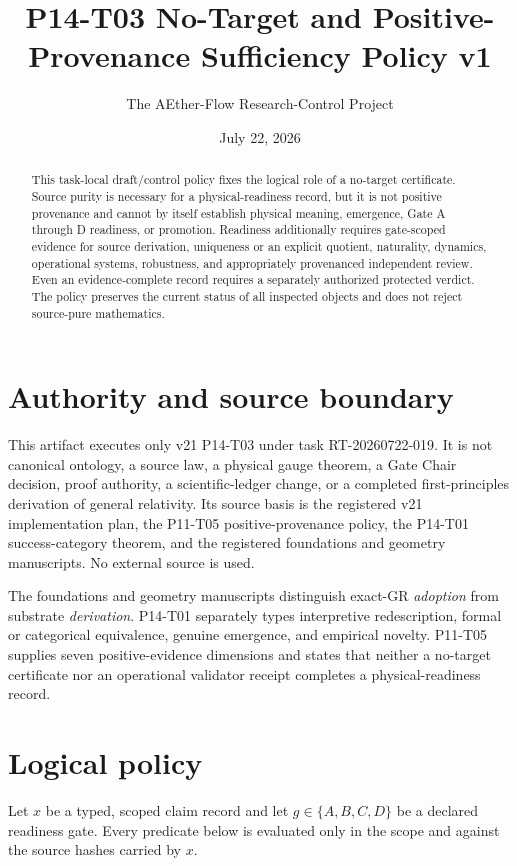 \documentclass[11pt]{article}
\title{P14-T03 No-Target and Positive-Provenance Sufficiency Policy v1}
\author{The AEther-Flow Research-Control Project}
\date{July 22, 2026}
\begin{document}
\maketitle

\begin{abstract}
This task-local draft/control policy fixes the logical role of a no-target
certificate.  Source purity is necessary for a physical-readiness record, but
it is not positive provenance and cannot by itself establish physical meaning,
emergence, Gate A through D readiness, or promotion.  Readiness additionally
requires gate-scoped evidence for source derivation, uniqueness or an explicit
quotient, naturality, dynamics, operational systems, robustness, and
appropriately provenanced independent review.  Even an evidence-complete record
requires a separately authorized protected verdict.  The policy preserves the
current status of all inspected objects and does not reject source-pure
mathematics.
\end{abstract}

\section{Authority and source boundary}

This artifact executes only v21 P14-T03 under task RT-20260722-019.  It is not
canonical ontology, a source law, a physical gauge theorem, a Gate Chair
decision, proof authority, a scientific-ledger change, or a completed
first-principles derivation of general relativity.  Its source basis is the
registered v21 implementation plan, the P11-T05 positive-provenance policy, the
P14-T01 success-category theorem, and the registered foundations and geometry
manuscripts.  No external source is used.

The foundations and geometry manuscripts distinguish exact-GR \emph{adoption}
from substrate \emph{derivation}.  P14-T01 separately types interpretive
redescription, formal or categorical equivalence, genuine emergence, and
empirical novelty.  P11-T05 supplies seven positive-evidence dimensions and
states that neither a no-target certificate nor an operational validator
receipt completes a physical-readiness record.

\section{Logical policy}

Let $x$ be a typed, scoped claim record and let $g\in\{A,B,C,D\}$ be a
declared readiness gate.  Every predicate below is evaluated only in the scope
and against the source hashes carried by $x$.
\end{document}
